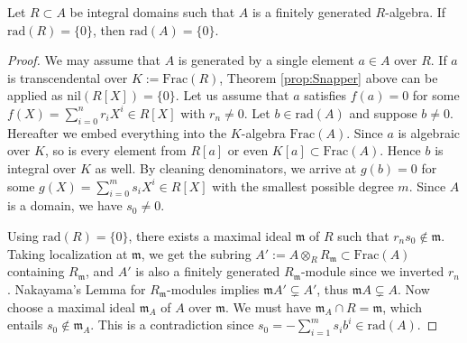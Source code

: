 \begin{lemma}
	Let $R \subset A$ be integral domains such that $A$ is a finitely generated $R$-algebra. If $\mathrm{rad}(R)=\{0\}$, then $\mathrm{rad}(A)=\{0\}$.
\end{lemma}
\begin{proof}
	We may assume that $A$ is generated by a single element $a \in A$ over $R$. If $a$ is transcendental over $K := \text{Frac}(R)$, Theorem \ref{prop:Snapper} above can be applied as $\mathrm{nil}(R[X]) = \{0\}$. Let us assume that $a$ satisfies $f(a)=0$ for some $f(X) = \sum_{i=0}^n r_i X^i \in R[X]$ with $r_n \neq 0$. Let $b \in \text{rad}(A)$ and suppose $b \neq 0$. Hereafter we embed everything into the $K$-algebra $\text{Frac}(A)$. Since $a$ is algebraic over $K$, so is every element from $R[a]$ or even $K[a] \subset \text{Frac}(A)$. Hence $b$ is integral over $K$ as well. By cleaning denominators, we arrive at $g(b)=0$ for some $g(X) = \sum_{i=0}^m s_i X^i \in R[X]$ with the smallest possible degree $m$. Since $A$ is a domain, we have $s_0 \neq 0$.

	Using $\text{rad}(R) =\{0\}$, there exists a maximal ideal $\mathfrak{m}$ of $R$ such that $r_n s_0 \not\in \mathfrak{m}$. Taking localization at $\mathfrak{m}$, we get the subring $A' := A \otimes_R R_{\mathfrak{m}} \subset \text{Frac}(A)$ containing $R_{\mathfrak{m}}$, and $A'$ is also a finitely generated $R_{\mathfrak{m}}$-module since we inverted $r_n$. Nakayama's Lemma for $R_{\mathfrak{m}}$-modules implies $\mathfrak{m} A' \subsetneq A'$, thus $\mathfrak{m} A \subsetneq A$. Now choose a maximal ideal $\mathfrak{m}_A$ of $A$ over $\mathfrak{m}$. We must have $\mathfrak{m}_A \cap R = \mathfrak{m}$, which entails $s_0 \not\in \mathfrak{m}_A$. This is a contradiction since $s_0 = -\sum_{i=1}^m s_i b^i \in \text{rad}(A)$.
\end{proof}

